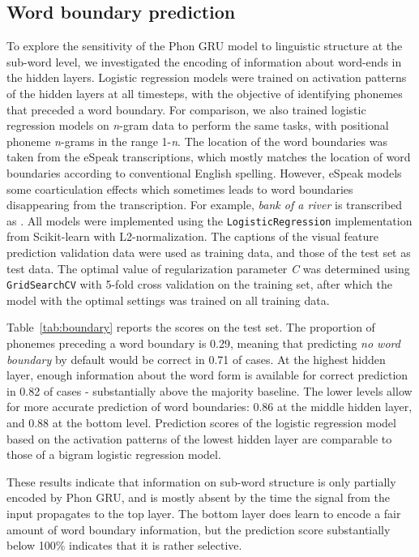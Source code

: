 
\subsection{Word boundary prediction}
To explore the sensitivity of the {\sc Phon GRU} model to linguistic structure at the sub-word level, we investigated the encoding of information about word-ends in the hidden layers. Logistic regression models were trained on activation patterns of the hidden layers at all timesteps, with the objective of identifying phonemes that preceded a word boundary. For comparison, we also trained logistic regression models on \textit{n}-gram data to perform the same tasks, with positional phoneme \textit{n}-grams in the range 1-\textit{n}. The location of the word boundaries was taken from the eSpeak transcriptions, which mostly matches the location of word boundaries according to conventional English spelling. However, eSpeak models some coarticulation effects which sometimes leads to word boundaries disappearing from the transcription. For example, {\it bank of a river} is transcribed as .
All models were implemented using the {\tt LogisticRegression} implementation from Scikit-learn \cite{scikit-learn} with L2-normalization. The captions of the visual feature prediction validation data were used as training data, and those of the test set as test data. The optimal value of regularization parameter \textit{C} was determined using {\tt GridSearchCV} with 5-fold cross validation on the training set, after which the model with the optimal settings was trained on all training data.

Table~\ref{tab:boundary} reports the scores on the test set. The proportion of phonemes preceding a word boundary is 0.29, meaning that predicting {\it no word boundary} by default would be correct in 0.71 of cases. At the highest hidden layer, enough information about the word form is available for correct prediction in 0.82 of cases - substantially above the majority baseline. The lower levels allow for more accurate prediction of word boundaries: 0.86 at the middle hidden layer, and 0.88 at the bottom level.
Prediction scores of the logistic regression model based on the activation patterns of the lowest hidden layer are comparable to those of a bigram logistic regression model.

These results indicate that information on sub-word structure is only partially encoded by {\sc Phon GRU}, and is mostly absent by the time the signal from the input propagates to the top layer. The bottom layer does learn to encode a fair amount of word boundary information, but the prediction score substantially below 100\% indicates that it is rather selective. 

